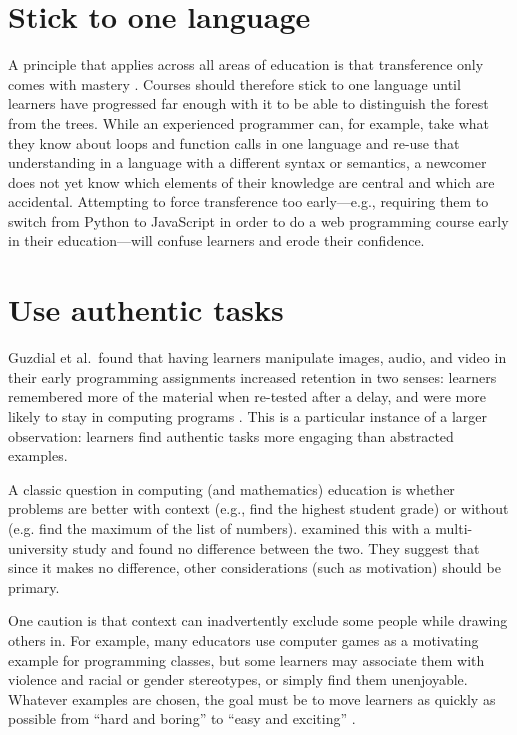 \documentclass{article}
\begin{document}
\section{Stick to one language}\label{one-language}

A principle that applies across all areas of education is that
transference only comes with mastery \citep{gick-holyoak}.
Courses should therefore stick to one language until learners have progressed far enough with it
to be able to distinguish the forest from the trees.
While an experienced programmer can,
for example,
take what they know about loops and function calls in one language
and re-use that understanding in a language with a different syntax or semantics,
a newcomer does not yet know which elements of their knowledge are central
and which are accidental.
Attempting to force transference too early---e.g.,
requiring them to switch from Python to JavaScript in order to do a web programming course
early in their education---will confuse learners and erode their confidence.

\section{Use authentic tasks}\label{authentic-tasks}

Guzdial et al.\ found that having learners manipulate images, audio, and video
in their early programming assignments
increased retention in two senses:
learners remembered more of the material when re-tested after a delay,
and were more likely to stay in computing programs \citep{guzdial-media}.
This is a particular instance of a larger observation:
learners find authentic tasks more engaging than abstracted examples.

A classic question in computing (and mathematics) education
is whether problems are better with context (e.g., find the highest student grade)
or without (e.g. find the maximum of the list of numbers).
\citet{bouvier-context} examined this with a multi-university study
and found no difference between the two.
They suggest that since it makes no difference,
other considerations (such as motivation) should be primary.

One caution is that context can inadvertently exclude some people while drawing others in.
For example,
many educators use computer games as a motivating example for programming classes,
but some learners may associate them with violence and racial or gender stereotypes,
or simply find them unenjoyable.
Whatever examples are chosen,
the goal must be to move learners as quickly as possible
from ``hard and boring'' to ``easy and exciting'' \cite{repenning}.
\end{document}
